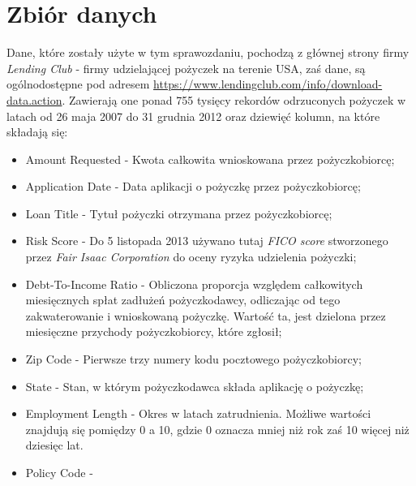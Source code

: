 \documentclass[11pt]{article}
\begin{document}
\newpage

\tableofcontents

\newpage

\begin{abstract}

\end{abstract}

\newpage

\section{Zbiór danych}

Dane, które zostały użyte w tym sprawozdaniu, pochodzą z głównej strony firmy \textit{Lending Club} - firmy udzielającej pożyczek na terenie USA, zaś dane, są ogólnodostępne pod adresem \hyperref[https://www.lendingclub.com/info/download-data.action]{https://www.lendingclub.com/info/download-data.action}. Zawierają one ponad 755 tysięcy rekordów odrzuconych pożyczek w latach od 26 maja 2007 do 31 grudnia 2012 oraz dziewięć kolumn, na które składają się:
\begin{itemize}
\item Amount Requested - Kwota całkowita wnioskowana przez pożyczkobiorcę;
\item Application Date - Data aplikacji o pożyczkę przez pożyczkobiorcę;
\item Loan Title - Tytuł pożyczki otrzymana przez pożyczkobiorcę;
\item Risk Score - Do 5 listopada 2013 używano tutaj \textit{FICO score} stworzonego przez \textit{Fair Isaac Corporation} do oceny ryzyka udzielenia pożyczki;
\item Debt-To-Income Ratio - Obliczona proporcja względem całkowitych miesięcznych spłat zadłużeń pożyczkodawcy, odliczając od tego zakwaterowanie i wnioskowaną pożyczkę. Wartość ta, jest dzielona przez miesięczne przychody pożyczkobiorcy, które zgłosił;
\item Zip Code - Pierwsze trzy numery kodu pocztowego pożyczkobiorcy;
\item State - Stan, w którym pożyczkodawca składa aplikację o pożyczkę;
\item Employment Length - Okres w latach zatrudnienia. Możliwe wartości znajdują się pomiędzy 0 a 10, gdzie 0 oznacza mniej niż rok zaś 10 więcej niż dziesięc lat.
\item Policy Code - 
\end{itemize}

\clearpage

\listoffigures

\clearpage

\listoftables
\end{document}
